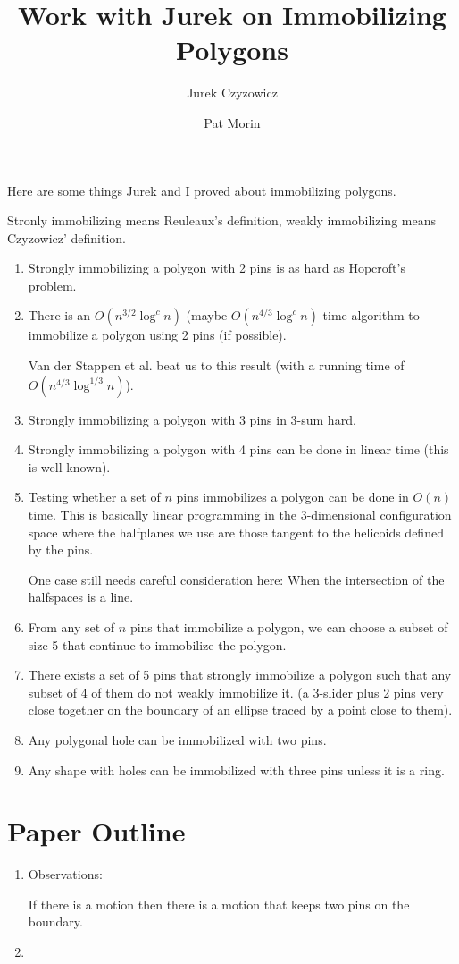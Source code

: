\documentclass{article}
\title{Work with Jurek on Immobilizing Polygons}
\author{Jurek Czyzowicz \and Pat Morin}
\begin{document}
\maketitle

Here are some things Jurek and I proved about immobilizing polygons.

Stronly immobilizing means Reuleaux's definition, weakly immobilizing
means Czyzowicz' definition.

\begin{enumerate}

\item Strongly immobilizing a polygon with 2 pins is as hard as
Hopcroft's problem.

\item There is an $O(n^{3/2}\log^c n)$ (maybe $O(n^{4/3}\log^c n)$
time algorithm to immobilize a polygon using 2 pins (if possible).

Van der Stappen et al. beat us to this result (with a running time of
$O(n^{4/3}\log^{1/3} n)$).

\item Strongly immobilizing a polygon with 3 pins in 3-sum hard.

\item Strongly immobilizing a polygon with 4 pins can be done in
linear time (this is well known).

\item Testing whether a set of $n$ pins immobilizes a polygon can be
done in $O(n)$ time.  This is basically linear programming in the
3-dimensional configuration space where the halfplanes we use are
those tangent to the helicoids defined by the pins.

One case still needs careful consideration here: When the intersection
of the halfspaces is a line.  

\item From any set of $n$ pins that immobilize a polygon, we can
choose a subset of size 5 that continue to immobilize the polygon.

\item There exists a set of 5 pins that strongly immobilize a polygon
such that any subset of 4 of them do not weakly immobilize it. (a
3-slider plus 2 pins very close together on the boundary of an ellipse
traced by a point close to them).

\item Any polygonal hole can be immobilized with two pins.

\item Any shape with holes can be immobilized with three pins unless
it is a ring.

\end{enumerate}

\section{Paper Outline}

\begin{enumerate}
\item Observations: 

If there is a motion then there is a motion that keeps two pins on the boundary.
\item 
\end{enumerate}
\end{document}
